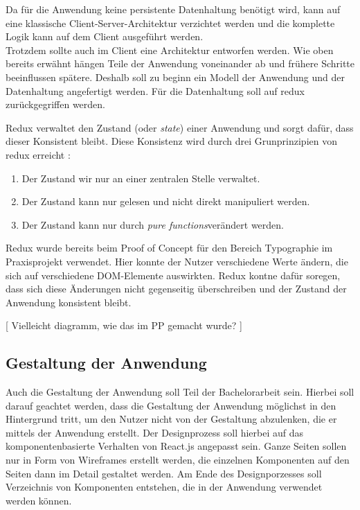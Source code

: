 Da für die Anwendung keine persistente Datenhaltung benötigt wird, kann auf eine klassische Client-Server-Architektur verzichtet werden und die komplette Logik kann auf dem Client ausgeführt werden.\\
Trotzdem sollte auch im Client eine Architektur entworfen werden. Wie oben bereits erwähnt hängen Teile der Anwendung voneinander ab und frühere Schritte beeinflussen spätere. Deshalb soll zu beginn ein Modell der Anwendung und der Datenhaltung angefertigt werden. Für die Datenhaltung soll auf redux zurückgegriffen werden.

Redux verwaltet den Zustand (oder \textit{state}) einer Anwendung und sorgt dafür, dass dieser Konsistent bleibt. Diese Konsistenz wird durch drei Grunprinzipien von redux erreicht \cite{threeprinciplesredux}:

\begin{enumerate}
  \item Der Zustand wir nur an einer zentralen Stelle verwaltet.
  \item Der Zustand kann nur gelesen und nicht direkt manipuliert werden.
  \item Der Zustand kann nur durch \textit{pure functions}\footnotemark verändert werden.
\end{enumerate}

Redux wurde bereits beim Proof of Concept für den Bereich Typographie im Praxisprojekt verwendet. Hier konnte der Nutzer verschiedene Werte ändern, die sich auf verschiedene DOM-Elemente auswirkten. Redux kontne dafür soregen, dass sich diese Änderungen nicht gegenseitig überschreiben und der Zustand der Anwendung konsistent bleibt.

[ Vielleicht diagramm, wie das im PP gemacht wurde? ]

\subsection{Gestaltung der Anwendung}
Auch die Gestaltung der Anwendung soll Teil der Bachelorarbeit sein. Hierbei soll darauf geachtet werden, dass die Gestaltung der Anwendung möglichst in den Hintergrund tritt, um den Nutzer nicht von der Gestaltung abzulenken, die er mittels der Anwendung erstellt.
Der Designprozess soll hierbei auf das komponentenbasierte Verhalten von React.js angepasst sein. Ganze Seiten sollen  nur in Form von Wireframes erstellt werden, die einzelnen Komponenten auf den Seiten dann im Detail gestaltet werden. Am Ende des Designporzesses soll Verzeichnis von Komponenten entstehen, die in der Anwendung verwendet werden können.

